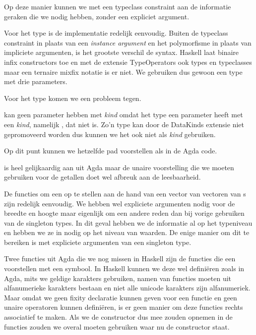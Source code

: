 
Op deze manier kunnen we met een typeclass constraint aan de informatie geraken
die we nodig hebben, zonder een expliciet argument.

Voor het  type is de implementatie redelijk eenvoudig. Buiten de
typeclass constraint in plaats van een \emph{instance argument} en het
polymorfisme in plaats van impliciete argumenten, is het grootste verschil de
syntax. Haskell laat binaire infix constructors toe en met de extensie
TypeOperators \cite{typeops} ook types en typeclasses maar een ternaire mixfix
notatie is er niet. We gebruiken dus gewoon een type met drie parameters.


Voor het type  komen we een probleem tegen.


 kan geen parameter hebben met \emph{kind}  omdat het
type  een parameter heeft met een \emph{kind}, namelijk
, dat niet \ihask{*} is. Zo'n type kan door de DataKinds extensie
niet gepromoveerd worden dus kunnen we het ook niet als \emph{kind} gebruiken.

Op dit punt kunnen we hetzelfde pad voorstellen als in de Agda code.


 is heel gelijkaardig aan  uit Agda maar de unaire
voorstelling die we moeten gebruiken voor de getallen doet wel afbreuk aan de
leesbaarheid.

De functies om een  op te stellen aan de hand van een vector van
vectoren van s zijn redelijk eenvoudig. We hebben wel
expliciete argumenten nodig voor de breedte en hoogte maar eigenlijk om een
andere reden dan bij vorige gebruiken van de singleton types. In dit geval
hebben we de informatie al op het typeniveau en hebben we ze in
 nodig op het niveau van waarden. De enige manier om dit
te bereiken is met expliciete argumenten van een singleton type.


Twee functies uit Agda die we nog missen in Haskell zijn de functies die een
 voorstellen met een symbool. In Haskell kunnen we deze wel
definiëren zoals in Agda, mits we geldige karakters gebruiken, namen van
functies moeten uit alfanumerieke karakters bestaan en niet alle unicode
karakters zijn alfanumeriek. Maar omdat we geen fixity declaratie kunnen geven
voor een functie en geen unaire operatoren kunnen definiëren, is er geen manier
om deze functies rechts associatief te maken. Als we de constructor
\ihask{(:>)} dus mee zouden opnemen in de functies zouden we overal \ihask{$}
moeten gebruiken waar nu de constructor staat.

